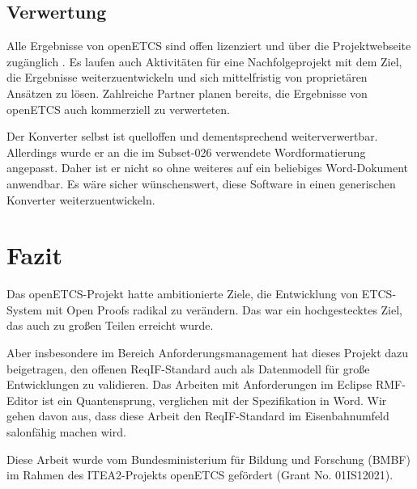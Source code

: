 \documentclass[twoside]{article}
\begin{document}
\begin{multicols}{2}
\subsection{Verwertung}

Alle Ergebnisse von openETCS sind offen lizenziert und über die Projektwebseite zugänglich \cite{itea-openetcs}.  Es laufen auch Aktivitäten für eine Nachfolgeprojekt mit dem Ziel, die Ergebnisse weiterzuentwickeln und sich mittelfristig von proprietären Ansätzen zu lösen.  Zahlreiche Partner planen bereits, die Ergebnisse von openETCS auch kommerziell zu verwerteten.

Der Konverter selbst ist quelloffen und dementsprechend weiterverwertbar. Allerdings wurde er an die im Subset-026 verwendete Wordformatierung angepasst.  Daher ist er nicht so ohne weiteres auf ein beliebiges Word-Dokument anwendbar. Es wäre sicher wünschenswert, diese Software in einen generischen Konverter weiterzuentwickeln.

\section{Fazit}

Das openETCS-Projekt hatte ambitionierte Ziele, die Entwicklung von ETCS-System mit \glqq{}Open Proofs\grqq{} radikal zu verändern. Das war ein hochgestecktes Ziel, das auch zu großen Teilen erreicht wurde.

Aber insbesondere im Bereich Anforderungsmanagement hat dieses Projekt dazu beigetragen, den offenen ReqIF-Standard auch als Datenmodell für große Entwicklungen zu validieren.  Das Arbeiten mit Anforderungen im Eclipse RMF-Editor ist ein Quantensprung, verglichen mit der Spezifikation in Word. Wir gehen davon aus, dass diese Arbeit den ReqIF-Standard im Eisenbahnumfeld salonfähig machen wird.

Diese Arbeit wurde vom Bundesministerium für Bildung und Forschung (BMBF) im Rahmen des ITEA2-Projekts openETCS gefördert (Grant No. 01IS12021).

\end{multicols}

\titleformat{\section}[block]{\large\scshape\centering{}}{}{1em}{}



\end{document}
